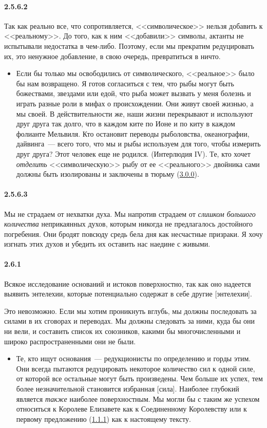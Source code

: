\paragraph{2.5.6.2}\hypertarget{par:2.5.6.2}{} Так как реально все, что сопротивляется, <<символическое>> нельзя добавить к <<реальному>>. До того, как к ним <<добавили>> символы, актанты не испытывали недостатка в чем-либо. Поэтому, если мы прекратим редуцировать их, это ненужное добавление, в свою очередь, превратиться в ничто. 
	\begin{itemize}
	\item 
	Если бы только мы освободились от символического, <<реальное>> было бы нам возвращено. Я готов согласиться с тем, что рыбы могут быть божествами, звездами или едой, что рыба может вызвать у меня болезнь и играть разные роли в мифах о происхождении. Они живут своей жизнью, а мы своей. В действительности же, наши жизни перекрывают и используют друг друга так долго, что в каждом ките по Ионе и по киту в каждом фолианте Мельвиля. Кто остановит переводы рыболовства, океанографии, дайвинга~--- всего того, что мы и рыбы используем для того, чтобы измерить друг друга? Этот человек еще не родился. (Интерлюдия IV). Те, кто хочет {\itshape отделить} <<символическую>> рыбу от ее <<реального>> двойника сами должны быть изолированы и заключены в  тюрьму (\hyperlink{par:3.0.0}{3.0.0}).
	\end{itemize}

\paragraph{2.5.6.3}\hypertarget{par:2.5.6.3}{} Мы не страдаем от нехватки духа. Мы напротив страдаем от {\itshape слишком большого количества} неприкаянных духов, которым никогда не предлагалось достойного погребения. Они бродят повсюду средь бела дня как несчастные призраки. Я хочу изгнать этих духов и убедить их оставить нас наедине с живыми.

\paragraph{2.6.1}\hypertarget{par:2.6.1}{}\hypertarget{par:2.6.1}{Всякое исследование оснований и  истоков поверхностно, так как оно надеется выявить энтелехии, которые потенциально содержат в себе другие [энтелехии].} Это невозможно. Если мы хотим проникнуть вглубь, мы должны последовать за силами в их сговорах и переводах. Мы должны следовать за ними, куда бы они ни вели, и составить список их союзников, какими бы многочисленными и широко распространенными они не
были. 
	\begin{itemize}
	\item 
	Те, кто ищут основания~--- редукционисты по определению и горды этим. Они всегда пытаются редуцировать некоторое количество сил к одной силе, от которой все остальные могут быть произведены. Чем больше их успех, тем более незначительной становится избранная [сила]. Наиболее глубокий является {\itshape также} наиболее поверхностным. Мы могли бы с таким же успехом относиться к Королеве Елизавете как к Соединенному Королевству или к первому предложению (\hyperlink{par:1.1.1}{1.1.1}) как к настоящему тексту.
	\end{itemize}

